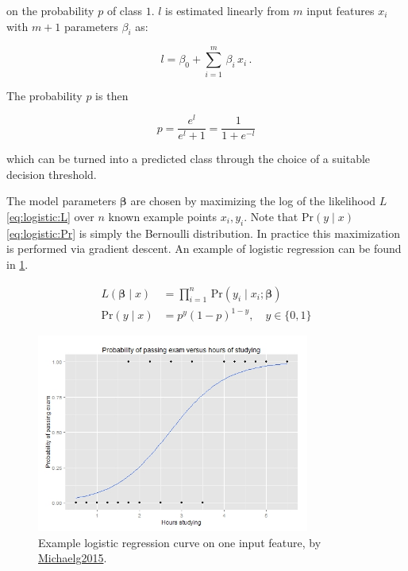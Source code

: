 \noindent on the probability $p$ of class $1$.
$l$ is estimated linearly from $m$ input features $x_{i}$ with $m+1$ parameters $\beta_{i}$ as:

\begin{equation}\label{eq:logistic:logicBeta}
l = \beta_{0} + \sum_{i=1}^{m} \, \beta_{i}\,x_{i}\,.
\end{equation}

\noindent The probability $p$ is then

\begin{equation}\label{eq:logistic:p}
p = \frac{e^l}{e^l + 1} = \frac{1}{1+e^{-l}}
\end{equation}

\noindent which can be turned into a predicted class through the choice of a suitable decision threshold.

The model parameters $\bm{\beta}$ are chosen by maximizing
the log of the likelihood $L$ \cref{eq:logistic:L} over $n$ known example points $x_{i}, y_{i}$.
Note that $\mathrm{Pr}\left(y \mid x\right)$ \cref{eq:logistic:Pr} is simply the Bernoulli distribution.
In practice this maximization is performed via gradient descent.
An example of logistic regression can be found in \cref{fig:logistic_regression_ex}.

\begin{subequations} \label{eq:logistic:L_Pr}
\begin{align}
L\left(\bm{\beta} \mid x\right) &= \prod_{i=1}^{n} \, \mathrm{Pr}\left(y_{i} \mid x_{i}; \bm{\beta}\right) \label{eq:logistic:L} \\
\mathrm{Pr}\left(y \mid x\right) &= p^y\left(1-p\right)^{1-y}, \quad y \in \{0, 1\} \label{eq:logistic:Pr}
\end{align}
\end{subequations}

\begin{figure}
\centering
\includegraphics[width=0.8\textwidth]{figures/regression/Exam_pass_logistic_curve.jpeg}
\caption{
Example logistic regression curve on one input feature, by \href{https://en.wikipedia.org/wiki/File:Exam_pass_logistic_curve.jpeg}{Michaelg2015}.
}
\label{fig:logistic_regression_ex}
\end{figure}

